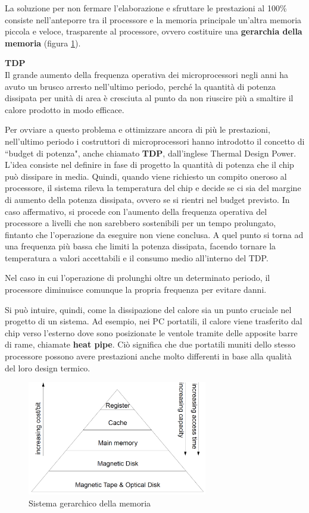 \documentclass[11pt,4paper]{report}
\begin{document}
La soluzione per non fermare l'elaborazione e sfruttare le prestazioni al 100\% consiste nell'anteporre tra il processore e la memoria principale un'altra memoria piccola e veloce, trasparente al processore, ovvero costituire una \textbf{gerarchia della memoria} (figura \ref{fig:gerarchia}).

\begin{tcolorbox}
\textbf{TDP}\\
Il grande aumento della frequenza operativa dei microprocessori negli anni ha avuto un brusco arresto nell'ultimo periodo, perché la quantità di potenza dissipata per unità di area è cresciuta al punto da non riuscire più a smaltire il calore prodotto in modo efficace.

Per ovviare a questo problema e ottimizzare ancora di più le prestazioni, nell'ultimo periodo i costruttori di microprocessori hanno introdotto il concetto di ``budget di potenza", anche chiamato \textbf{TDP}, dall'inglese Thermal Design Power. L'idea consiste nel definire in fase di progetto la quantità di potenza che il chip può dissipare in media. Quindi, quando viene richiesto un compito oneroso al processore, il sistema rileva la temperatura del chip e decide se ci sia del margine di aumento della potenza dissipata, ovvero se si rientri nel budget previsto. In caso affermativo, si procede con l'aumento della frequenza operativa del processore a livelli che non sarebbero sostenibili per un tempo prolungato, fintanto che l'operazione da eseguire non viene conclusa. A quel punto si torna ad una frequenza più bassa che limiti la potenza dissipata, facendo tornare la temperatura a valori accettabili e il consumo medio all'interno del TDP.

Nel caso in cui l'operazione di prolunghi oltre un determinato periodo, il processore diminuisce comunque la propria frequenza per evitare danni.

Si può intuire, quindi, come la dissipazione del calore sia un punto cruciale nel progetto di un sistema. Ad esempio, nei PC portatili, il calore viene trasferito dal chip verso l'esterno dove sono posizionate le ventole tramite delle apposite barre di rame, chiamate \textbf{heat pipe}. Ciò significa che due portatili muniti dello stesso processore possono avere prestazioni anche molto differenti in base alla qualità del loro design termico.
\end{tcolorbox}

\begin{figure}[hbtp]
	\centering
	\includegraphics[width=0.7\textwidth]{mem_sys/gerarchia}
	\caption{Sistema gerarchico della memoria}
	\label{fig:gerarchia}
\end{figure}
\end{document}
